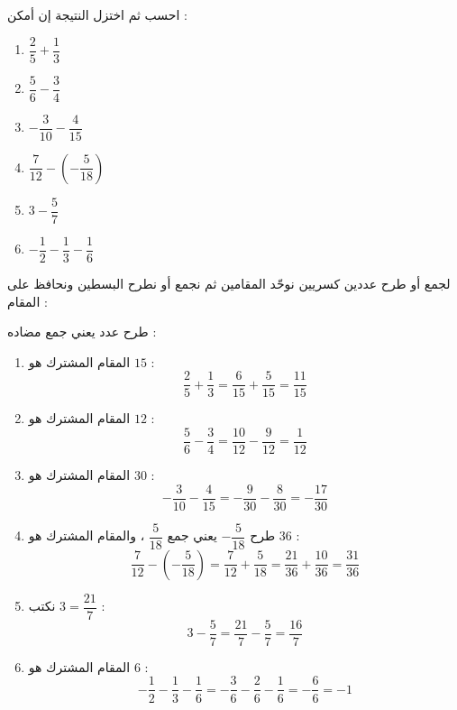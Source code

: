 \documentclass[12pt,a4paper]{article}
\begin{document}
\begin{corr}[title={الجمع والطرح}, stars=1, source={Axiomaths}]
احسب ثم اختزل النتيجة إن أمكن :
\begin{enumerate}
  \item $\dfrac{2}{5}+\dfrac{1}{3}$
  \item $\dfrac{5}{6}-\dfrac{3}{4}$
  \item $-\dfrac{3}{10}-\dfrac{4}{15}$
  \item $\dfrac{7}{12}-\left(-\dfrac{5}{18}\right)$
  \item $3-\dfrac{5}{7}$
  \item $-\dfrac{1}{2}-\dfrac{1}{3}-\dfrac{1}{6}$
\end{enumerate}
\axsol
\begin{prop}[قاعدة]
لجمع أو طرح عددين كسريين نوحّد المقامين ثم نجمع أو نطرح البسطين ونحافظ على المقام :
\end{prop}
\begin{prop}
طرح عدد يعني جمع مضاده : 
\end{prop}
\begin{enumerate}[itemsep=14pt]
  \item المقام المشترك هو $15$ :
  \[\dfrac{2}{5}+\dfrac{1}{3}=\dfrac{6}{15}+\dfrac{5}{15}=\dfrac{11}{15}\]
  \item المقام المشترك هو $12$ :
  \[\dfrac{5}{6}-\dfrac{3}{4}=\dfrac{10}{12}-\dfrac{9}{12}=\dfrac{1}{12}\]
  \item المقام المشترك هو $30$ :
  \[-\dfrac{3}{10}-\dfrac{4}{15}=-\dfrac{9}{30}-\dfrac{8}{30}=-\dfrac{17}{30}\]
  \item طرح $-\dfrac{5}{18}$ يعني جمع $\dfrac{5}{18}$ ، والمقام المشترك هو $36$ :
  \[\dfrac{7}{12}-\left(-\dfrac{5}{18}\right)=\dfrac{7}{12}+\dfrac{5}{18}=\dfrac{21}{36}+\dfrac{10}{36}=\dfrac{31}{36}\]
  \item نكتب $3=\dfrac{21}{7}$ :
  \[3-\dfrac{5}{7}=\dfrac{21}{7}-\dfrac{5}{7}=\dfrac{16}{7}\]
  \item المقام المشترك هو $6$ :
  \[-\dfrac{1}{2}-\dfrac{1}{3}-\dfrac{1}{6}=-\dfrac{3}{6}-\dfrac{2}{6}-\dfrac{1}{6}=-\dfrac{6}{6}=-1\]
\end{enumerate}
\end{corr}
\end{document}
